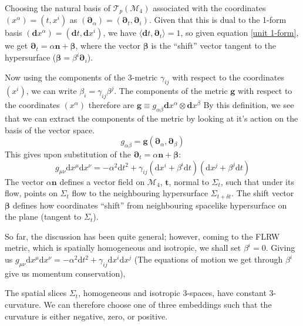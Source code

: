 \documentclass[aps,prd,reprint,preprintnumbers,showpacs,floatfix,nofootinbib,superscript address]{revtex4-2}
\begin{document}
Choosing the natural basis of $\mathcal{T}_p(\mathcal{M}_4)$ associated with the coordinates $(x^\alpha) =(t,x^i)$ as $(\bm{\partial}_\alpha)=(\bm{\partial}_t, \bm{\partial}_i)$. Given that this is dual to the 1-form basis $(\textbf{d}x^\alpha) = (\textbf{d}t, \textbf{d}x^i)$, we have $\langle \textbf{d}t, \bm{\partial}_t \rangle = 1$, so given equation \ref{unit 1-form}, we get $\bm{\partial}_t = \alpha \bm{n} + \bm{\beta}$, where the vector $\bm{\beta}$ is the ``shift'' vector tangent to the hypersurface ($\bm{\beta} = \beta^i \boldsymbol{\partial}_i$). 

Now using the components of the 3-metric $\gamma_{i j}$ with respect to the coordinates $(x^i)$, we can write $\beta_i = \gamma_{ij}\beta^j$. The components of the metric $\bm{g}$ with respect to the coordinates $(x^\alpha)$ therefore are $\bm{g} \equiv g_{\alpha \beta} \textbf{d}x^\alpha \otimes \textbf{d}x^\beta$
By this definition, we see that we can extract the components of the metric by looking at it's action on the basis of the vector space. 
\begin{equation}
    g_{\alpha\beta} = \bm{g} (\bm{\partial}_\alpha, \bm{\partial}_\beta)
\end{equation}
This gives upon substitution of the $\bm{\partial}_t = \alpha \bm{n} + \bm{\beta}$:
\begin{equation}
    g_{\mu \nu} \text{d}x^\mu\text{d}x^\nu = -\alpha^2 \text{d}t^2 + \gamma_{ij}(\text{d}x^i + \beta^i \text{d}t)(\text{d}x^j + \beta^j \text{d}t)
\end{equation}
The vector $\alpha \bm{n}$ defines a vector field on $\mathcal{M}_4$, $\bm{t}$, normal to $\Sigma_t$, such that under its flow, points on $\Sigma_t$ flow to the neighbouring hypersurface $\Sigma_{t+\delta t}$. The shift vector $\bm{\beta}$ defines how coordinates ``shift'' from neighbouring spacelike hypersurface on the plane (tangent to $\Sigma_t$). 

So far, the discussion has been quite general; however, coming to the FLRW metric, which is spatially homogeneous and isotropic, we shall set $\beta^i = 0$. Giving us $g_{\mu \nu} \text{d}x^\mu\text{d}x^\nu = -\alpha^2 \text{d}t^2 + \gamma_{ij}\text{d}x^i\text{d}x^j$ (The equations of motion we get through $\beta^i$ give us momentum conservation),

The spatial slices $\Sigma_t$, homogeneous and isotropic 3-spaces, have constant 3-curvature. We can therefore choose one of three embeddings such that the curvature is either negative, zero, or positive. 
\end{document}
